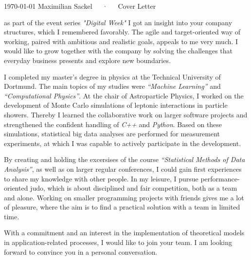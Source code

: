 \documentclass[11pt, a4paper]{Awesome-CV/awesome-cv}
\begin{document}
\makecvheader[R]

\makecvfooter
{\today}
{Maximilian Sackel~~~·~~~Cover Letter}
{}

\makelettertitle

\begin{cvletter}
    as part of the event series \textit{"Digital Week"} I got an insight into your company structures,
    which I remembered favorably.
    The agile and target-oriented way of working,
    paired with ambitious and realistic goals,
    appeals to me very much.
    I would like to grow together with the company by solving the challenges that everyday business presents
    and explore new boundaries.

    I completed my master's degree in physics at the Technical University of Dortmund.
    The main topics of my studies were \textit{``Machine Learning''} and \textit{``Computational Physics''}.
    At the chair of Astroparticle Physics, I worked on the development of Monte Carlo simulations of leptonic interactions in particle showers.
    Thereby I learned the collaborative work on larger software projects and strengthened the confident handling of \textit{C++} and \textit{Python}.
    Based on these simulations, statistical big data analyses are performed for measurement experiments,
    at which I was capable to actively participate in the development.

    By creating and holding the excersises of the course \textit{``Statistical Methods of Data Analysis''}, as well as on larger regular conferences,
    I could gain first experiences to share my knowledge with other people.
    In my leisure, I pursue performance-oriented judo, which is about disciplined and fair competition, both as a team and alone.
    Working on smaller programming projects with friends gives me a lot of
    pleasure, where the aim is to find a practical solution with a team in
    limited time. %

    With a commitment and an interest in the implementation of
    theoretical models in application-related processes, I would like to join
    your team.
    I am looking forward to convince you in a personal conversation.

\end{cvletter}


\makeletterclosing
\end{document}
